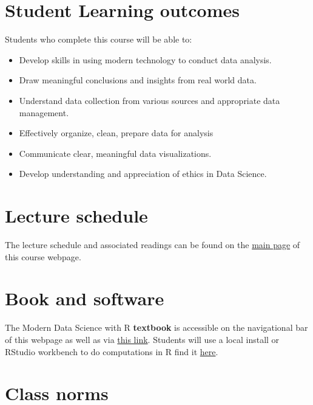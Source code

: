 \documentclass[
  letterpaper,
  DIV=11,
  numbers=noendperiod]{scrartcl}
\begin{document}
\hypertarget{student-learning-outcomes}{%
\section{Student Learning outcomes}\label{student-learning-outcomes}}

Students who complete this course will be able to:

\begin{itemize}
\item
  Develop skills in using modern technology to conduct data analysis.
\item
  Draw meaningful conclusions and insights from real world data.
\item
  Understand data collection from various sources and appropriate data
  management.
\item
  Effectively organize, clean, prepare data for analysis
\item
  Communicate clear, meaningful data visualizations.
\item
  Develop understanding and appreciation of ethics in Data Science.
\end{itemize}

\hypertarget{lecture-schedule}{%
\section{Lecture schedule}\label{lecture-schedule}}

The lecture schedule and associated readings can be found on the
\href{https://nics-github.github.io/MTH_190_Intro_to_DS/}{main page} of
this course webpage.

\hypertarget{book-and-software}{%
\section{Book and software}\label{book-and-software}}

The Modern Data Science with R \textbf{textbook} is accessible on the
navigational bar of this webpage as well as via
\href{https://mdsr-book.github.io/mdsr2e/}{this link}. Students will use
a local install or RStudio workbench to do computations in R find it
\href{https://rstudio.smith.edu}{here}.

\hypertarget{policies}{%
\section{Class norms}\label{policies}}
\end{document}
